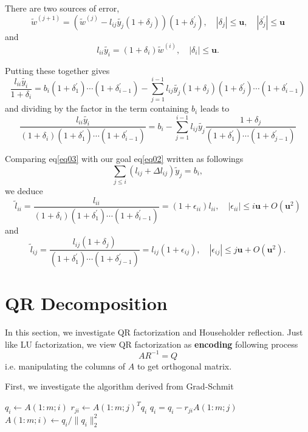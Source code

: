 \documentclass[dvipsnames, 12pt]{article}
\newcommand{\uu}{\mathbf{u}}
\begin{document}
There are two sources of error,
$$
\tilde{w}^{(j+1)}=\left(\tilde{w}^{(j)}-l_{i j} \tilde{y_j}\left(1+\delta_j\right)\right)\left(1+\delta_j^{\prime}\right), \quad\left|\delta_j\right| \leq \uu, \quad\left|\delta_j^{\prime}\right| \leq \uu
$$
and
$$
l_{i i} \tilde{y_i}=\left(1+\delta_i\right) \tilde{w}^{(i)}, \quad\left|\delta_i\right| \leq \uu .
$$

Putting these together gives
$$
\frac{l_{i i} \tilde{y_i}}{1+\delta_i}=b_i\left(1+\delta_1^{\prime}\right) \cdots\left(1+\delta_{i-1}^{\prime}\right)-\sum_{j=1}^{i-1} l_{i j} \tilde{y_j}\left(1+\delta_j\right)\left(1+\delta_j^{\prime}\right) \cdots\left(1+\delta_{i-1}^{\prime}\right)
$$
and dividing by the factor in the term containing $b_i$ leads to
\begin{equation}\label{eq03}
    \frac{l_{i i} \tilde{y_i}}{\left(1+\delta_i\right)\left(1+\delta_1^{\prime}\right) \cdots\left(1+\delta_{i-1}^{\prime}\right)}=b_i-\sum_{j=1}^{i-1} l_{i j} \tilde{y_j} \frac{1+\delta_j}{\left(1+\delta_1^{\prime}\right) \cdots\left(1+\delta_{j-1}^{\prime}\right)}
\end{equation}

Comparing eq\eqref{eq03} with our goal eq\eqref{eq02} written as followings
$$
\sum_{j\leq i} (l_{ij}+\Delta l_{ij})\tilde{y}_{j}=b_{i},
$$
we deduce 
$$
\tilde{l}_{i i}=\frac{l_{i i}}{\left(1+\delta_i\right)\left(1+\delta_1^{\prime}\right) \cdots\left(1+\delta_{i-1}^{\prime}\right)}=\left(1+\epsilon_{i i}\right) l_{i i}, \quad\left|\epsilon_{i i}\right| \leq i \uu+O\left(\uu^2\right)
$$
and
$$
\tilde{l}_{i j}=\frac{l_{i j}\left(1+\delta_j\right)}{\left(1+\delta_1^{\prime}\right) \cdots\left(1+\delta_{j-1}^{\prime}\right)}=l_{i j}\left(1+\epsilon_{i j}\right), \quad\left|\epsilon_{i j}\right| \leq j \uu+O\left(\uu^2\right) .
$$


\newpage

\section{QR Decomposition}

In this section, we investigate QR factorization and Householder reflection.
Just like LU factorization, we view QR factorization as \textbf{encoding} following process
$$
AR^{-1}=Q
$$
i.e. manipulating the columns of $A$ to get orthogonal matrix.

First, we investigate the algorithm derived from Grad-Schmit

\begin{algorithm}
    \begin{algorithmic}[1]
        \State $q_{i} \gets A(1:m;i)$
           \State $r_{ji}\gets A(1:m;j)^{T}q_{i}$ \;
           \State $q_{i}=q_{i}-r_{ji} A(1:m;j)$ \;
        \EndFor
    \State $A(1:m;i)\gets q_{i}/\|q_{i}\|_{2}^{2}$\;
    \EndFor
    \end{algorithmic}
\end{algorithm}
\end{document}
